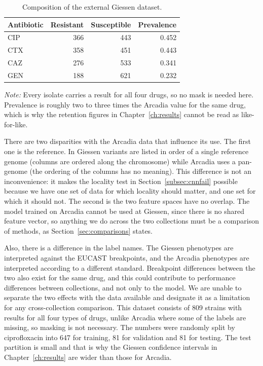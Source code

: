 \begin{table}[htb]
\centering
\caption{Composition of the external Giessen dataset.}
\label{tab:giessen}
\small
\begin{tabular}{|l|r|r|r|}
\hline
\textbf{Antibiotic} & \textbf{Resistant} & \textbf{Susceptible} & \textbf{Prevalence} \\
\hline
CIP & 366 & 443 & 0.452 \\ \hline
CTX & 358 & 451 & 0.443 \\ \hline
CAZ & 276 & 533 & 0.341 \\ \hline
GEN & 188 & 621 & 0.232 \\ \hline
\end{tabular}
\vspace{0.4em}

\noindent\footnotesize\textit{Note:} Every isolate carries a result for all four drugs, so no
mask is needed here. Prevalence is roughly two to three times the Arcadia value for the same
drug, which is why the retention figures in Chapter~\ref{ch:results} cannot be read as
like-for-like.
\end{table}

There are two disparities with the Arcadia data that influence its use. The first one is the
reference. In Giessen variants are listed in order of a single reference genome (columns are
ordered along the chromosome) while Arcadia uses a pan-genome (the ordering of the columns has
no meaning). This difference is not an inconvenience: it makes the locality test in
Section~\ref{subsec:cnnfail} possible because we have one set of data for which locality
should matter, and one set for which it should not. The second is the two feature spaces have
no overlap. The model trained on Arcadia cannot be used at Giessen, since there is no shared
feature vector, so anything we do across the two collections must be a comparison of methods,
as Section~\ref{sec:comparisons} states.

\vspace{1em}

Also, there is a difference in the label names. The Giessen phenotypes are interpreted against
the EUCAST breakpoints, and the Arcadia phenotypes are interpreted according to a different
standard. Breakpoint differences between the two also exist for the same drug, and this could
contribute to performance differences between collections, and not only to the model. We are
unable to separate the two effects with the data available and designate it as a limitation
for any cross-collection comparison. This dataset consists of 809 strains with results for all
four types of drugs, unlike Arcadia where some of the labels are missing, so masking is not
necessary. The numbers were randomly split by ciprofloxacin into 647 for training, 81 for
validation and 81 for testing. The test partition is small and that is why the Giessen
confidence intervals in Chapter~\ref{ch:results} are wider than those for Arcadia.

